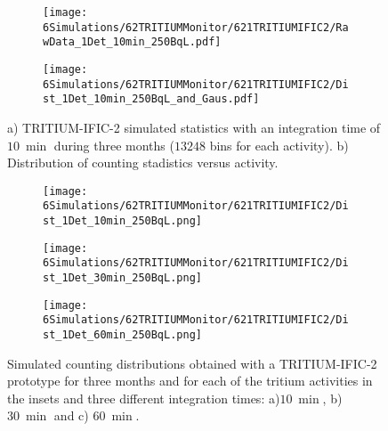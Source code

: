 \begin{figure}
\centering
    \begin{subfigure}[b]{1\textwidth}
    \centering
    \texttt{[image: 6Simulations/62TRITIUMMonitor/621TRITIUMIFIC2/RawData\_1Det\_10min\_250BqL.pdf]}  
    \caption{\label{subfig:RawData1Det10Min250BqL}}
    \end{subfigure}
    \hfill
    \begin{subfigure}[b]{1\textwidth}
    \centering
    \texttt{[image: 6Simulations/62TRITIUMMonitor/621TRITIUMIFIC2/Dist\_1Det\_10min\_250BqL\_and\_Gaus.pdf]}  
    \caption{\label{subfig:Dist1Det10Min250BqL}}
    \end{subfigure}
 \caption{a) TRITIUM-IFIC-2 simulated statistics with an integration time of $10~\min$ during three months ($13248$ bins for each activity). b) Distribution of counting stadistics versus activity.}
 \label{fig:1Det10Min250BqL}
\end{figure}

\begin{figure}
\centering
    \begin{subfigure}[b]{0.6\textwidth}
    \centering
    \texttt{[image: 6Simulations/62TRITIUMMonitor/621TRITIUMIFIC2/Dist\_1Det\_10min\_250BqL.png]}  
    \caption{\label{subfig:1Det10min250BqLST}}
    \end{subfigure}
    \hfill
    \begin{subfigure}[b]{0.6\textwidth}
    \centering
    \texttt{[image: 6Simulations/62TRITIUMMonitor/621TRITIUMIFIC2/Dist\_1Det\_30min\_250BqL.png]}  
    \caption{\label{subfig:1Det30min250BqLST}}
    \end{subfigure}
    \hfill
    \begin{subfigure}[b]{0.6\textwidth}
    \centering
    \texttt{[image: 6Simulations/62TRITIUMMonitor/621TRITIUMIFIC2/Dist\_1Det\_60min\_250BqL.png]}  
    \caption{\label{subfig:1Det60min250BqLST}}
    \end{subfigure}
 \caption{Simulated counting distributions obtained with a TRITIUM-IFIC-2 prototype for three months and for each of the tritium activities in the insets and three different integration times: a)$10~\min$, b) $30~\min$ and c) $60~\min$.}
 \label{fig:1Det250BqLseveralTimes}
\end{figure} 

